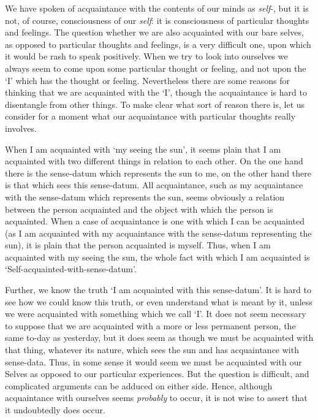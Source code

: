 \documentclass[oneside,letterpaper,12pt]{book}
\begin{document}
We have spoken of acquaintance with the contents of our minds as
\emph{self}-\hspace{0pt}{consciousness}, but it is not, of course, consciousness of
our \emph{self}: it is consciousness of particular thoughts and
feelings. The question whether we are also acquainted with our bare
selves, as opposed to particular thoughts and feelings, is a very
difficult one, upon which it would be rash to speak positively. When we
try to look into ourselves we always seem to come upon some particular
thought or feeling, and not upon the
`I' which has the thought or feeling.
Nevertheless there are some reasons for thinking that we are acquainted
with the `I', though the acquaintance is
hard to disentangle from other things. To make clear what sort of reason
there is, let us consider for a moment what our acquaintance with
particular thoughts really involves.

When I am acquainted with `my seeing the
sun', it seems plain that I am acquainted with two
different things in relation to each other. On the one hand there is the
sense-datum which represents the sun to me, on the other hand there is
that which sees this sense-datum. All acquaintance, such as my
acquaintance with the sense-datum which represents the sun, seems
obviously a relation between the person acquainted and the object with
which the person is acquainted. When a case of acquaintance is one with
which I can be acquainted (as I am acquainted with my acquaintance with
the sense-datum representing the sun), it is plain that the person
acquainted is myself. Thus, when I am acquainted with my seeing the sun,
the whole fact with which I am acquainted is
`Self-acquainted-with-sense-datum'.

Further, we know the truth `I am acquainted with this
sense-datum'. It is hard to see how we could know this
truth, or even understand what is meant by it, unless we were acquainted
with something which we call `I'. It does
not seem necessary to suppose that we are acquainted with a more or less
permanent person, the same to-day as yesterday, but it does seem as
though we must be acquainted with that thing, whatever its nature, which
sees the sun and has acquaintance with sense-data. Thus, in some sense
it would seem we must be acquainted with our Selves as opposed to our
particular experiences. But the question is difficult, and complicated
arguments can be adduced on either side. Hence, although acquaintance
with ourselves seems \emph{probably} to occur, it is not wise to assert
that it undoubtedly does occur.
\end{document}
